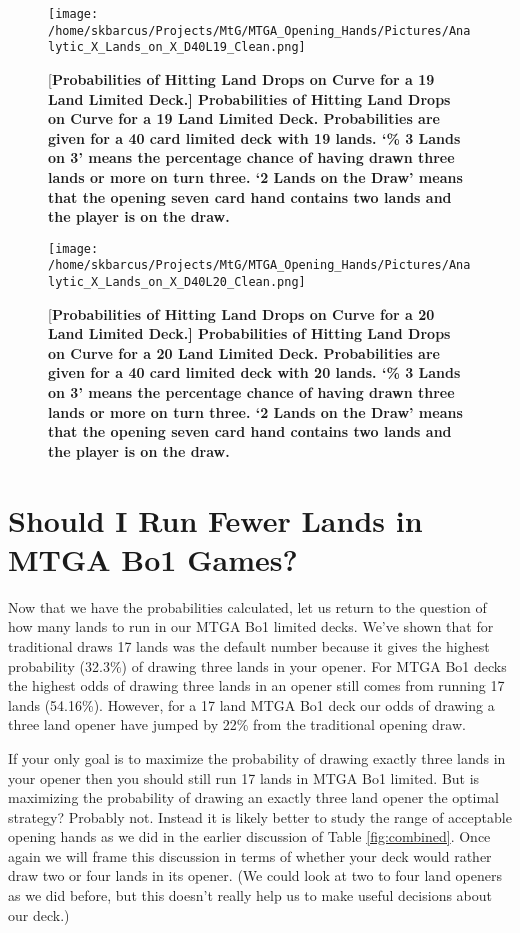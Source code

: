 \documentclass[oneside]{book}   %
\begin{document}
	\begin{figure}[!ht]
	\centering
	\centerline{\texttt{[image: /home/skbarcus/Projects/MtG/MTGA\_Opening\_Hands/Pictures/Analytic\_X\_Lands\_on\_X\_D40L19\_Clean.png]}}
	[\bf{Probabilities of Hitting Land Drops on Curve for a 19 Land Limited Deck.}]{
	{\bf{Probabilities of Hitting Land Drops on Curve for a 19 Land Limited Deck.}} Probabilities are given for a 40 card limited deck with 19 lands. `\% 3 Lands on 3' means the percentage chance of having drawn three lands or more on turn three. `2 Lands on the Draw' means that the opening seven card hand contains two lands and the player is on the draw.}
	\label{fig:19_curve}
	\end{figure}	
	
	\begin{figure}[!ht]
	\centering
	\centerline{\texttt{[image: /home/skbarcus/Projects/MtG/MTGA\_Opening\_Hands/Pictures/Analytic\_X\_Lands\_on\_X\_D40L20\_Clean.png]}}
	[\bf{Probabilities of Hitting Land Drops on Curve for a 20 Land Limited Deck.}]{
	{\bf{Probabilities of Hitting Land Drops on Curve for a 20 Land Limited Deck.}} Probabilities are given for a 40 card limited deck with 20 lands. `\% 3 Lands on 3' means the percentage chance of having drawn three lands or more on turn three. `2 Lands on the Draw' means that the opening seven card hand contains two lands and the player is on the draw.}
	\label{fig:20_curve}
	\end{figure}	
	
\section{Should I Run Fewer Lands in MTGA Bo1 Games?}

Now that we have the probabilities calculated, let us return to the question of how many lands to run in our MTGA Bo1 limited decks. We've shown that for traditional draws 17 lands was the default number because it gives the highest probability (32.3\%) of drawing three lands in your opener. For MTGA Bo1 decks the highest odds of drawing three lands in an opener still comes from running 17 lands (54.16\%). However, for a 17 land MTGA Bo1 deck our odds of drawing a three land opener have jumped by 22\% from the traditional opening draw. 

If your only goal is to maximize the probability of drawing exactly three lands in your opener then you should still run 17 lands in MTGA Bo1 limited. But is maximizing the probability of drawing an exactly three land opener the optimal strategy? Probably not. Instead it is likely better to study the range of acceptable opening hands as we did in the earlier discussion of Table \ref{fig:combined}. Once again we will frame this discussion in terms of whether your deck would rather draw two or four lands in its opener. (We could look at two to four land openers as we did before, but this doesn't really help us to make useful decisions about our deck.) 
\end{document}
